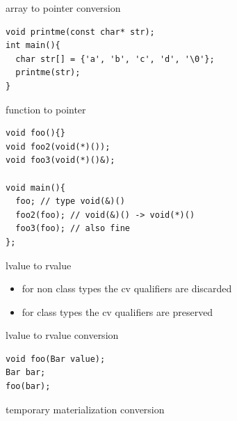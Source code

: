 \documentclass[10pt]{beamer}
\begin{document}
\begin{frame}[fragile]{array to pointer conversion}
	\begin{verbatim}
void printme(const char* str);
int main(){
  char str[] = {'a', 'b', 'c', 'd', '\0'};
  printme(str); 
}
	\end{verbatim}
\end{frame}

\begin{frame}[fragile]{function to pointer}
	\begin{verbatim}
void foo(){} 
void foo2(void(*)()); 
void foo3(void(*)()&);

void main(){
  foo; // type void(&)()
  foo2(foo); // void(&)() -> void(*)()
  foo3(foo); // also fine
};
	\end{verbatim}
\end{frame}


\begin{frame}{lvalue to rvalue}
	\begin{itemize}
		\item for non class types the cv qualifiers are discarded
		\item for class types the cv qualifiers are preserved
	\end{itemize}
\end{frame}

\begin{frame}[fragile]{lvalue to rvalue conversion}
	\begin{verbatim}
void foo(Bar value);
Bar bar;
foo(bar);
	\end{verbatim}
\end{frame}

\begin{frame}{temporary materialization conversion}
	
\end{frame}
\end{document}

